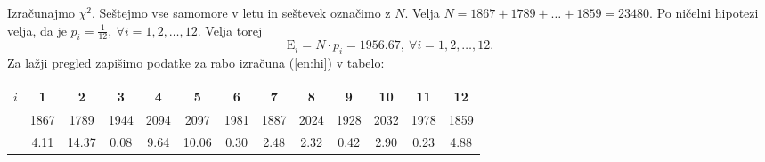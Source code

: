 \documentclass[a4paper,12pt]{article}
\begin{document}
\noindent
Izračunajmo $\chi^2$.
Seštejmo vse samomore v letu in seštevek označimo z $N$. Velja $ N = 1867 + 1789 + \ldots + 1859 = 23480$. Po ničelni hipotezi velja, da je $p_i = \frac{1}{12}, \ \forall i = 1, 2, \ldots, 12$. Velja torej 
$$\text{E}_i =  N \cdot p_i = 1956.67, \ \forall i = 1, 2, \ldots, 12.$$
Za lažji pregled zapišimo podatke za rabo izračuna (\ref{en:hi}) v tabelo:
\\
\begin{table}[h!]
    \begin{center}
        \begin{tabular}{|c|c|c|c|c|c|c|c|c|c|c|c|c|}
            \hline
            \rowcolor[HTML]{FFFFFF} 
            {\color[HTML]{333333} \textbf{$i$}}                                                 & \textbf{1}                   & \textbf{2}                   & \textbf{3}                   & \textbf{4}                   & \textbf{5}                   & \textbf{6}                   & \textbf{7}                   & \textbf{8}                   & \textbf{9}                   & \textbf{10}                  & \textbf{11}                  & \textbf{12} \\ \hline
            \cellcolor[HTML]{FFFFFF}{\color[HTML]{333333} \textbf{$O_i$}}                       & \cellcolor[HTML]{FFFFFF}1867 & \cellcolor[HTML]{FFFFFF}1789 & \cellcolor[HTML]{FFFFFF}1944 & \cellcolor[HTML]{FFFFFF}2094 & \cellcolor[HTML]{FFFFFF}2097 & \cellcolor[HTML]{FFFFFF}1981 & \cellcolor[HTML]{FFFFFF}1887 & \cellcolor[HTML]{FFFFFF}2024 & \cellcolor[HTML]{FFFFFF}1928 & \cellcolor[HTML]{FFFFFF}2032 & \cellcolor[HTML]{FFFFFF}1978 & 1859        \\ \hline
            \cellcolor[HTML]{FFFFFF}{\color[HTML]{333333} \textbf{$\frac{(O_i - E_i)^2}{E_i}$}} & 4.11                         & 14.37                        & 0.08                         & 9.64                         & 10.06                        & 0.30                         & 2.48                         & 2.32                         & 0.42                         & 2.90                         & 0.23                         & 4.88        \\ \hline
        \end{tabular}
    \end{center}
\end{table}
\end{document}

